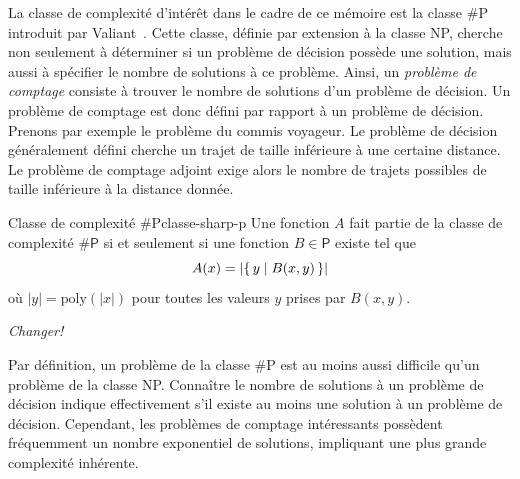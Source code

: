 

La classe de complexité d'intérêt dans le cadre de ce mémoire est la classe \textsf{\#P} introduit par Valiant~\cite{valiantComplexityComputingPermanent1979}. Cette classe, définie par extension à la classe \textsf{NP}, cherche non seulement à déterminer si un problème de décision possède une solution, mais aussi à spécifier le nombre de solutions à ce problème. Ainsi, un \textit{problème de comptage} consiste à trouver le nombre de solutions d'un problème de décision. Un problème de comptage est donc défini par rapport à un problème de décision. Prenons par exemple le problème du commis voyageur. Le problème de décision généralement défini cherche un trajet de taille inférieure à une certaine distance. Le problème de comptage adjoint exige alors le nombre de trajets possibles de taille inférieure à la distance donnée. 

\begin{maindefinition}{Classe de complexité \textsf{\#P}}{classe-sharp-p}
    Une fonction $A$ fait partie de la classe de complexité $\textsf{\#P}$ si et seulement si une fonction $B \in \textsf{P}$ existe tel que
    \begin{equation*}
        A(x) = \lvert \set{ y \mid B(x, y)} \rvert
    \end{equation*}
    où $\lvert y \rvert = \mathrm{poly}(\lvert x \rvert)$ pour toutes les valeurs $y$ prises par $B(x,y)$.
\end{maindefinition}
\textcolor{mydarkred}{\textit{Changer!}}

Par définition, un problème de la classe \textsf{\#P} est au moins aussi difficile qu'un problème de la classe \textsf{NP}. Connaître le nombre de solutions à un problème de décision indique effectivement s'il existe au moins une solution à un problème de décision. Cependant, les problèmes de comptage intéressants possèdent fréquemment un nombre exponentiel de solutions, impliquant une plus grande complexité inhérente.

